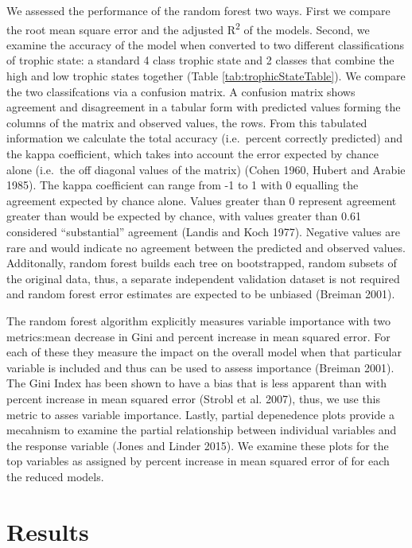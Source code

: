 \documentclass[11pt,]{article}
\begin{document}
We assessed the performance of the random forest two ways. First we
compare the root mean square error and the adjusted R\textsuperscript{2}
of the models. Second, we examine the accuracy of the model when
converted to two different classifications of trophic state: a standard
4 class trophic state and 2 classes that combine the high and low
trophic states together (Table \ref{tab:trophicStateTable}). We compare
the two classifcations via a confusion matrix. A confusion matrix shows
agreement and disagreement in a tabular form with predicted values
forming the columns of the matrix and observed values, the rows. From
this tabulated information we calculate the total accuracy (i.e.~percent
correctly predicted) and the kappa coefficient, which takes into account
the error expected by chance alone (i.e.~the off diagonal values of the
matrix) (Cohen 1960, Hubert and Arabie 1985). The kappa coefficient can
range from -1 to 1 with 0 equalling the agreement expected by chance
alone. Values greater than 0 represent agreement greater than would be
expected by chance, with values greater than 0.61 considered
``substantial'' agreement (Landis and Koch 1977). Negative values are
rare and would indicate no agreement between the predicted and observed
values. Additonally, random forest builds each tree on bootstrapped,
random subsets of the original data, thus, a separate independent
validation dataset is not required and random forest error estimates are
expected to be unbiased (Breiman 2001).

The random forest algorithm explicitly measures variable importance with
two metrics:mean decrease in Gini and percent increase in mean squared
error. For each of these they measure the impact on the overall model
when that particular variable is included and thus can be used to assess
importance (Breiman 2001). The Gini Index has been shown to have a bias
that is less apparent than with percent increase in mean squared error
(Strobl et al. 2007), thus, we use this metric to asses variable
importance. Lastly, partial depenedence plots provide a mecahnism to
examine the partial relationship between individual variables and the
response variable (Jones and Linder 2015). We examine these plots for
the top variables as assigned by percent increase in mean squared error
of for each the reduced models.

\section{Results}\label{results}
\end{document}
